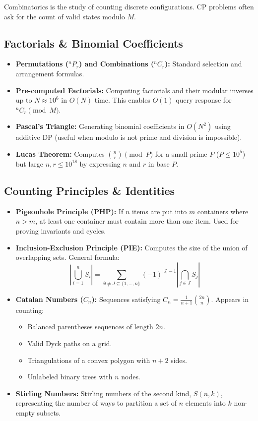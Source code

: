 \documentclass[10pt,journal,compsoc,onecolumn]{IEEEtran}
\begin{document}
Combinatorics is the study of counting discrete configurations. CP problems often ask for the count of valid states modulo $M$.

\subsection{Factorials \& Binomial Coefficients}
\begin{itemize}
    \item \textbf{Permutations ($^nP_r$) and Combinations ($^nC_r$):} Standard selection and arrangement formulas.
    \item \textbf{Pre-computed Factorials:} Computing factorials and their modular inverses up to $N \approx 10^6$ in $O(N)$ time. This enables $O(1)$ query response for $^nC_r \pmod M$.
    \item \textbf{Pascal's Triangle:} Generating binomial coefficients in $O(N^2)$ using additive DP (useful when modulo is not prime and division is impossible).
    \item \textbf{Lucas Theorem:} Computes $\binom{n}{r} \pmod P$ for a small prime $P$ ($P \leq 10^5$) but large $n, r \leq 10^{18}$ by expressing $n$ and $r$ in base $P$.
\end{itemize}

\subsection{Counting Principles \& Identities}
\begin{itemize}
    \item \textbf{Pigeonhole Principle (PHP):} If $n$ items are put into $m$ containers where $n > m$, at least one container must contain more than one item. Used for proving invariants and cycles.
    \item \textbf{Inclusion-Exclusion Principle (PIE):} Computes the size of the union of overlapping sets. General formula:
    \[
    \left| \bigcup_{i=1}^n S_i \right| = \sum_{\emptyset \neq J \subseteq \{1,\dots,n\}} (-1)^{|J|-1} \left| \bigcap_{j \in J} S_j \right|
    \]
    \item \textbf{Catalan Numbers ($C_n$):} Sequences satisfying $C_n = \frac{1}{n+1}\binom{2n}{n}$. Appears in counting:
    \begin{itemize}
        \item Balanced parentheses sequences of length $2n$.
        \item Valid Dyck paths on a grid.
        \item Triangulations of a convex polygon with $n+2$ sides.
        \item Unlabeled binary trees with $n$ nodes.
    \end{itemize}
    \item \textbf{Stirling Numbers:} Stirling numbers of the second kind, $S(n, k)$, representing the number of ways to partition a set of $n$ elements into $k$ non-empty subsets.
\end{itemize}
\end{document}

